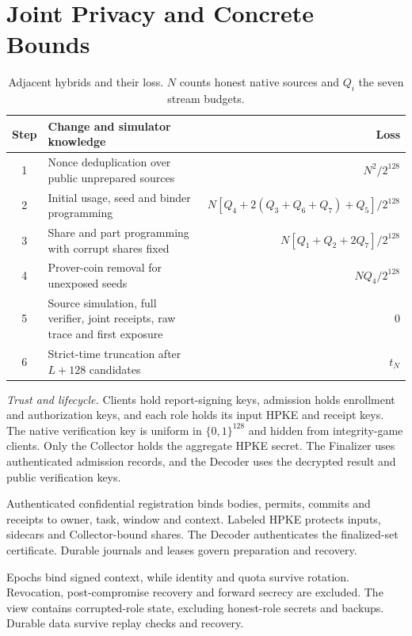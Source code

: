 \documentclass[conference,compsoc]{IEEEtran}
\theoremstyle{definition}
\numberwithin{equation}{section}
\numberwithin{table}{section}
\numberwithin{figure}{section}
\theoremstyle{plain}
\begin{document}
\section{Joint Privacy and Concrete Bounds}
\label{app:native-theory}

\begin{table}[t]
\centering
\caption{Adjacent hybrids and their loss. \(N\) counts honest native sources
and \(Q_i\) the seven stream budgets.}
\label{tab:hybrid-ledger}
\footnotesize
\renewcommand{\arraystretch}{1.08}
\begin{tabularx}{\textwidth}{@{}cYr@{}}
\toprule
\textbf{Step} & \textbf{Change and simulator knowledge} & \textbf{Loss} \\
 & Nonce deduplication over public unprepared sources & \(N^2/2^{128}\) \\
2 & Initial usage, seed and binder programming & \(N[Q_4+2(Q_3+Q_6+Q_7)+Q_5]/2^{128}\) \\
3 & Share and part programming with corrupt shares fixed & \(N[Q_1+Q_2+2Q_7]/2^{128}\) \\
4 & Prover-coin removal for unexposed seeds & \(NQ_4/2^{128}\) \\
5 & Source simulation, full verifier, joint receipts, raw trace and first exposure & \(0\) \\
6 & Strict-time truncation after \(L+128\) candidates & \(t_N\) \\
\bottomrule
\end{tabularx}
\end{table}

\par\noindent\emph{Trust and lifecycle.}
\label{app:trust-lifecycle}
Clients hold report-signing keys, admission holds enrollment and authorization keys,
and each role holds its input HPKE and receipt keys. The native verification key is uniform
in \(\{0,1\}^{128}\) and hidden from integrity-game clients. Only the Collector
holds the aggregate HPKE secret. The Finalizer uses authenticated admission records,
and the Decoder uses the decrypted result and public verification keys.

Authenticated confidential registration binds bodies, permits, commits and
receipts to owner, task, window and context. Labeled HPKE protects inputs,
sidecars and Collector-bound shares. The Decoder authenticates the finalized-set
certificate. Durable journals and leases govern preparation and recovery.

Epochs bind signed context, while identity and quota survive rotation.
Revocation, post-compromise recovery and forward secrecy are excluded.
The view contains corrupted-role state, excluding honest-role secrets and
backups. Durable data survive replay checks and recovery.
\end{document}

